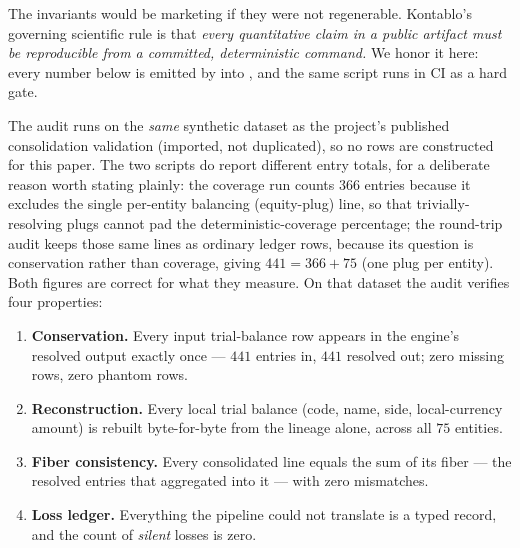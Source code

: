 \documentclass[11pt]{clapps}  %
\begin{document}
The invariants would be marketing if they were not regenerable. Kontablo's
governing scientific rule is that \emph{every quantitative claim in a public
artifact must be reproducible from a committed, deterministic command.} We honor
it here: every number below is emitted by 
into , and the same
script runs in CI as a hard gate.

The audit runs on the \emph{same} synthetic dataset as the project's published
consolidation validation (imported, not duplicated), so no rows are constructed
for this paper. The two scripts do report different entry totals, for a
deliberate reason worth stating plainly: the coverage run counts $366$ entries
because it excludes the single per-entity balancing (equity-plug) line, so that
trivially-resolving plugs cannot pad the deterministic-coverage percentage; the
round-trip audit keeps those same lines as ordinary ledger rows, because its
question is conservation rather than coverage, giving $441 = 366 + 75$ (one plug
per entity). Both figures are correct for what they measure. On that dataset the
audit verifies four properties:

\begin{enumerate}
  \item \textbf{Conservation.} Every input trial-balance row appears in the
  engine's resolved output exactly once --- $441$ entries in, $441$ resolved
  out; zero missing rows, zero phantom rows.
  \item \textbf{Reconstruction.} Every local trial balance (code, name, side,
  local-currency amount) is rebuilt byte-for-byte from the lineage alone,
  across all $75$ entities.
  \item \textbf{Fiber consistency.} Every consolidated line equals the sum of
  its fiber --- the resolved entries that aggregated into it --- with zero
  mismatches.
  \item \textbf{Loss ledger.} Everything the pipeline could not translate is a
  typed record, and the count of \emph{silent} losses is zero.
\end{enumerate}
\end{document}
